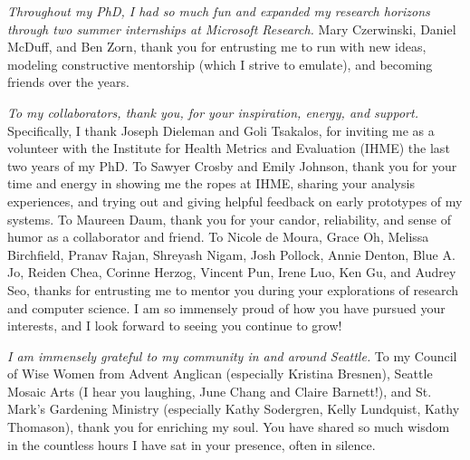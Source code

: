 \textit{Throughout my PhD, I had so much fun and expanded my research horizons
through two summer internships at Microsoft Research.} Mary Czerwinski, Daniel
McDuff, and Ben Zorn, thank you for entrusting me to run with new ideas,
modeling constructive mentorship (which I strive to emulate), and becoming
friends over the years.

\textit{To my collaborators, thank you, for your inspiration, energy, and support.}
Specifically, I thank Joseph Dieleman and Goli Tsakalos, for inviting me as
a volunteer with the Institute for Health Metrics and Evaluation (IHME) the
last two years of my PhD. To Sawyer Crosby and Emily Johnson, thank you for
your time and energy in showing me the ropes at IHME, sharing your analysis
experiences, and trying out and giving helpful feedback on early prototypes
of my systems. To Maureen Daum, thank you for your candor, reliability, and
sense of humor as a collaborator and friend. To Nicole de Moura, Grace Oh,
Melissa Birchfield, Pranav Rajan, Shreyash Nigam, Josh Pollock, Annie
Denton, Blue A. Jo, Reiden Chea, Corinne Herzog, Vincent Pun, Irene Luo, Ken
Gu, and Audrey Seo, thanks for entrusting me to mentor you during your
explorations of research and computer science. I am so immensely proud of
how you have pursued your interests, and I look forward to seeing
you continue to grow!

\textit{I am immensely grateful to my community in and around Seattle.} To my
Council of Wise Women from Advent Anglican (especially Kristina Bresnen),
Seattle Mosaic Arts (I hear you laughing, June Chang and Claire Barnett!), and
St. Mark's Gardening Ministry (especially Kathy Sodergren, Kelly Lundquist,
Kathy Thomason), thank you for enriching my soul. You have shared so much wisdom
in the countless hours I have sat in your presence, often in silence.

